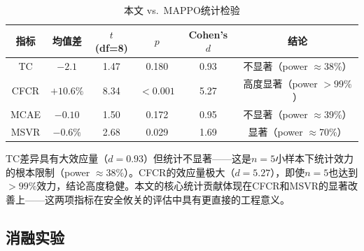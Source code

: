 \documentclass[12pt,a4paper,UTF8]{ctexart}
\begin{document}
\begin{table}[H]
    \centering
    \caption{本文 vs.\ MAPPO统计检验}
    \label{tab:ttest}
    \begin{tabular}{|c|c|c|c|c|c|}
        \hline
        \textbf{指标} & \textbf{均值差} & \textbf{$t$(df=8)} & \textbf{$p$} & \textbf{Cohen's $d$} & \textbf{结论} \\
        \hline
        TC & $-2.1$ & 1.47 & 0.180 & 0.93 & 不显著（power $\approx$38\%） \\
        CFCR & $+10.6\%$ & 8.34 & $<0.001$ & 5.27 & 高度显著（power $>99\%$） \\
        MCAE & $-0.10$ & 1.50 & 0.172 & 0.95 & 不显著（power $\approx$39\%） \\
        MSVR & $-0.6\%$ & 2.68 & 0.029 & 1.69 & 显著（power $\approx$70\%） \\
        \hline
    \end{tabular}
\end{table}

TC差异具有大效应量（$d=0.93$）但统计不显著——这是$n=5$小样本下统计效力的根本限制（power $\approx$38\%）。CFCR的效应量极大（$d=5.27$），即使$n=5$也达到$>99\%$效力，结论高度稳健。本文的核心统计贡献体现在CFCR和MSVR的显著改善上——这两项指标在安全攸关的评估中具有更直接的工程意义。

\subsection{消融实验}

\begin{table}[H]
    \centering
    \caption{消融实验结果（21架eVTOL，$n=5$）}
    \label{tab:ablation}
\end{table}
\end{document}
